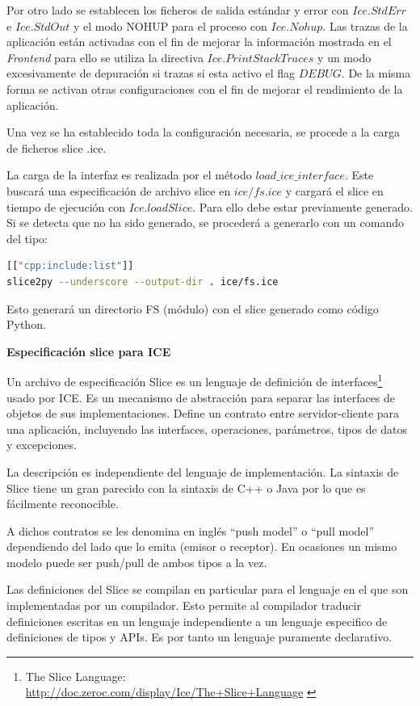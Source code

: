 Por otro lado se establecen los ficheros de salida estándar y error con
$Ice.StdErr$ e $Ice.StdOut$ y el modo NOHUP para el proceso con $Ice.Nohup$.
Las trazas de la aplicación están activadas con el fin de mejorar la información
mostrada en el \emph{Frontend} para ello se utiliza la directiva
$Ice.PrintStackTraces$ y un modo excesivamente de depuración si trazas si esta
activo el flag $DEBUG$. De la misma forma se activan otras configuraciones con
el fin de mejorar el rendimiento de la aplicación.

Una vez se ha establecido toda la configuración necesaria, se procede a la carga
de ficheros slice .ice.

La carga de la interfaz es realizada por el método $load\_ice\_interface$. Este
buscará una especificación de archivo slice en $ice/fs.ice$ y cargará el slice
en tiempo de ejecución con $Ice.loadSlice$. Para ello debe estar previamente
generado. Si se detecta que no ha sido generado, se procederá a generarlo con un
comando del tipo:

\begin{lstlisting}[language={bash}, texcl=false, caption={}]
[["cpp:include:list"]]
slice2py --underscore --output-dir . ice/fs.ice
\end{lstlisting}

Esto generará un directorio FS (módulo) con el slice generado como código
Python.

\newpage

\textbf{Especificación slice para ICE}

Un archivo de especificación Slice es un lenguaje de definición de
interfaces\footnote{The Slice Language:\\
\url{http://doc.zeroc.com/display/Ice/The+Slice+Language}
\label{ftn:slicelang}} usado por ICE. Es un mecanismo de abstracción para
separar las interfaces de objetos de sus implementaciones. Define un contrato entre
servidor-cliente para una aplicación, incluyendo las interfaces, 
operaciones, parámetros, tipos de datos y excepciones.

La descripción es independiente del lenguaje de implementación. La sintaxis de
Slice tiene un gran parecido con la sintaxis de C++ o Java por lo que es 
fácilmente reconocible.

A dichos contratos se les denomina en inglés ``push model'' o ``pull model''
dependiendo del lado que lo emita (emisor o receptor). En ocasiones un
mismo modelo puede ser push/pull de ambos tipos a la vez.

Las definiciones del Slice se compilan en particular para el lenguaje en el
que son implementadas por un compilador.
Esto permite al compilador traducir definiciones escritas en un lenguaje
independiente a un lenguaje especifico de definiciones de tipos y APIs. Es por
tanto un lenguaje puramente declarativo.

